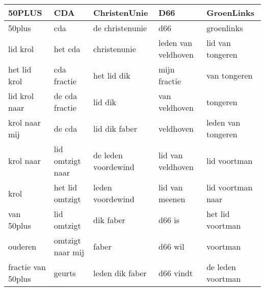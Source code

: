 \begin{tabular}{lllll}
\toprule
             50PLUS &               CDA &         ChristenUnie &                  D66 &          GroenLinks \\
\midrule
             50plus &               cda &      de christenunie &                  d66 &          groenlinks \\
           lid krol &           het cda &         christenunie &  leden van veldhoven &    lid van tongeren \\
       het lid krol &       cda fractie &          het lid dik &         mijn fractie &        van tongeren \\
      lid krol naar &    de cda fractie &              lid dik &        van veldhoven &            tongeren \\
      krol naar mij &            de cda &        lid dik faber &            veldhoven &  leden van tongeren \\
          krol naar &  lid omtzigt naar &  de leden voordewind &    lid van veldhoven &        lid voortman \\
               krol &   het lid omtzigt &     leden voordewind &       lid van meenen &   lid voortman naar \\
         van 50plus &       lid omtzigt &            dik faber &               d66 is &    het lid voortman \\
            ouderen &  omtzigt naar mij &                faber &              d66 wil &            voortman \\
 fractie van 50plus &            geurts &      leden dik faber &            d66 vindt &   de leden voortman \\
\bottomrule
\end{tabular}
